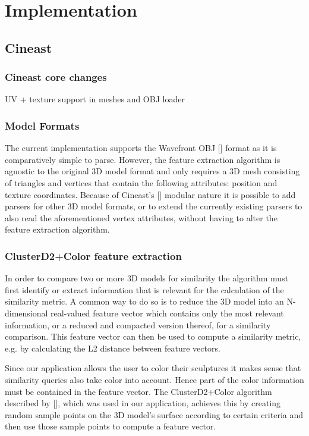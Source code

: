 \chapter{Implementation}

\section{Cineast}

\subsection{Cineast core changes}
UV + texture support in meshes and OBJ loader

\subsection{Model Formats}

The current implementation supports the Wavefront OBJ [] format as it is comparatively
simple to parse. However, the feature extraction algorithm is agnostic to the original 3D model format and only requires
a 3D mesh consisting of triangles and vertices that contain the following attributes: position and texture coordinates.
Because of Cineast's [] modular nature it is possible to add parsers for other 3D model formats, or
to extend the currently existing parsers to also read the aforementioned vertex attributes, without having to alter
the feature extraction algorithm.

\subsection{ClusterD2+Color feature extraction}


In order to compare two or more 3D models for similarity the algorithm must first identify or
extract information that is relevant for the calculation of the similarity metric.
A common way to do so is to reduce the 3D model into an N-dimensional real-valued feature vector which
contains only the most relevant information, or a reduced and compacted version thereof, for a similarity comparison. This feature vector can
then be used to compute a similarity metric, e.g. by calculating the L2 distance between feature vectors.

Since our application allows the user to color their sculptures it makes sense that similarity queries also
take color into account. Hence part of the color information must be contained in the feature vector.
The ClusterD2+Color algorithm described by [], which was used in our application,
achieves this by creating random sample points on the 3D model's surface according to certain criteria and then
use those sample points to compute a feature vector.


